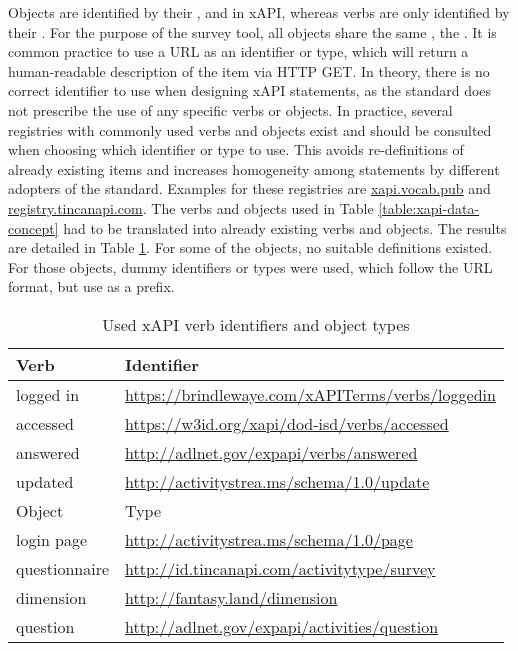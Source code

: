     Objects are identified by their ,  and  in xAPI, 
    whereas verbs are only identified by their . For the purpose of the
    survey tool, all objects share the same , the .
    It is common practice to use a URL as an identifier or type,
    which will return a human-readable description of the item via HTTP GET. In theory,
    there is no correct identifier to use when designing xAPI statements, as the
    standard does not prescribe the use of any specific verbs or objects. In practice,
    several registries with commonly used verbs and objects exist and should
    be consulted when choosing which identifier or type to use. This avoids re-definitions
    of already existing items and increases homogeneity among statements by
    different adopters of the standard. Examples for these registries are \url{xapi.vocab.pub}
    and \url{registry.tincanapi.com}. The verbs and objects 
    used in Table \ref{table:xapi-data-concept} had to be translated into already existing
    verbs and objects. The results are detailed in Table \ref{table:xapi-identifiers-used}.
    For some of the objects, no suitable definitions existed. For those
    objects, dummy identifiers or types were used, which follow the URL format, but use 
     as a prefix.

    \begin{table}
        \begin{tabularx}{\textwidth}{|l|X|}
            \hline
            Verb & Identifier \\
            \hline 
            logged in & \url{https://brindlewaye.com/xAPITerms/verbs/loggedin} \\
            accessed & \url{https://w3id.org/xapi/dod-isd/verbs/accessed}\\
            answered & \url{http://adlnet.gov/expapi/verbs/answered}\\
            updated & \url{http://activitystrea.ms/schema/1.0/update}\\
            \hline \hline
            Object & Type \\
            \hline
            login page & \url{http://activitystrea.ms/schema/1.0/page}\\
            questionnaire & \url{http://id.tincanapi.com/activitytype/survey}\\
            dimension & \url{http://fantasy.land/dimension}\\
            question & \url{http://adlnet.gov/expapi/activities/question} \\
            \hline
        \end{tabularx}
        \caption{Used xAPI verb identifiers and object types}
        \label{table:xapi-identifiers-used}
    \end{table}

